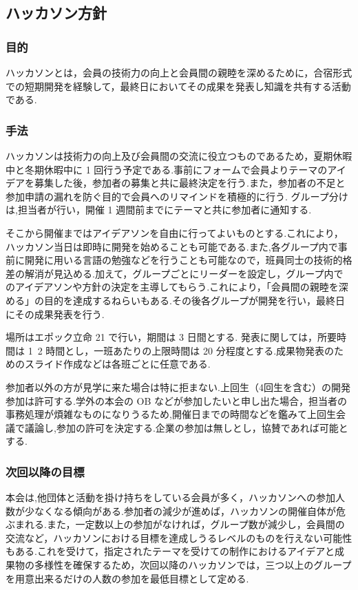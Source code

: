 \subsection*{ハッカソン方針}

\subsubsection*{目的}
ハッカソンとは，会員の技術力の向上と会員間の親睦を深めるために，合宿形式での短期開発を経験して，最終日においてその成果を発表し知識を共有する活動である.\\


\subsubsection*{手法}
ハッカソンは技術力の向上及び会員間の交流に役立つものであるため，夏期休暇中と冬期休暇中に 1 回行う予定である.事前にフォームで会員よりテーマのアイデアを募集した後，参加者の募集と共に最終決定を行う.また，参加者の不足と参加申請の漏れを防ぐ目的で会員へのリマインドを積極的に行う.
グループ分けは,担当者が行い，開催 1 週間前までにテーマと共に参加者に通知する.\par
そこから開催まではアイデアソンを自由に行ってよいものとする.これにより，ハッカソン当日は即時に開発を始めることも可能である.また,各グループ内で事前に開発に用いる言語の勉強などを行うことも可能なので，班員同士の技術的格差の解消が見込める.加えて，グループごとにリーダーを設定し，グループ内でのアイデアソンや方針の決定を主導してもらう.これにより，「会員間の親睦を深める」の目的を達成するねらいもある.その後各グループが開発を行い，最終日にその成果発表を行う.\par
場所はエポック立命 21 で行い，期間は 3 日間とする.
発表に関しては，所要時間は 1~2 時間とし，一班あたりの上限時間は 20 分程度とする.成果物発表のためのスライド作成などは各班ごとに任意である.\par
参加者以外の方が見学に来た場合は特に拒まない.上回生（4回生を含む）の開発参加は許可する.学外の本会の OB などが参加したいと申し出た場合，担当者の事務処理が煩雑なものになりうるため,開催日までの時間などを鑑みて上回生会議で議論し,参加の許可を決定する.企業の参加は無しとし，協賛であれば可能とする.\\


\subsubsection*{次回以降の目標}
本会は,他団体と活動を掛け持ちをしている会員が多く，ハッカソンへの参加人数が少なくなる傾向がある.参加者の減少が進めば，ハッカソンの開催自体が危ぶまれる.また，一定数以上の参加がなければ，グループ数が減少し，会員間の交流など，ハッカソンにおける目標を達成しうるレベルのものを行えない可能性もある.これを受けて，指定されたテーマを受けての制作におけるアイデアと成果物の多様性を確保するため，次回以降のハッカソンでは，三つ以上のグループを用意出来るだけの人数の参加を最低目標として定める.\\
